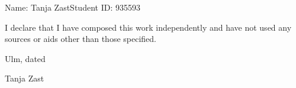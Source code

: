 \documentclass[a4paper,12pt,
headsepline,           %
oneside,               %
pointlessnumbers,      %
bibtotoc,              %
BCOR15mm               %
]{scrbook}
\newcommand{\fullname}{Tanja Zast}
\newcommand{\matnr}{935593}
\begin{document}


\tableofcontents

\mainmatter











\appendix


\backmatter
\nocite{Knappen2009}
\nocite{Mittelbach2005}
\nocite{Schlosser2014}
\nocite{Sturm2012}
\nocite{Voss2010}

\printbibliography

\listoffigures
\listoftables

\clearpage
\thispagestyle{empty}

Name: \fullname \hfill Student ID: \matnr \vspace{2cm}


I declare that I have composed this work independently and have not used any sources or aids other than those specified.\vspace{2cm}

Ulm, dated \dotfill

\hspace{10cm} {\footnotesize \fullname}
\end{document}
